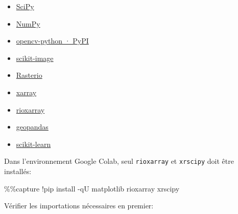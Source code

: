 \documentclass[
  11pt,
  letterpaper,
  open=any,
  twoside=false,
  french]{scrbook}
\newenvironment{Shaded}{\begin{snugshade}}{\end{snugshade}}
\newcommand{\NormalTok}[1]{\textcolor[rgb]{0.00,0.23,0.31}{#1}}
\newcommand{\OperatorTok}[1]{\textcolor[rgb]{0.37,0.37,0.37}{#1}}
\begin{document}
\begin{itemize}
\item
  \href{https://scipy.org/}{SciPy}
\item
  \href{https://numpy.org/}{NumPy}
\item
  \href{https://pypi.org/project/opencv-python/}{opencv-python · PyPI}
\item
  \href{https://scikit-image.org/}{scikit-image}
\item
  \href{https://rasterio.readthedocs.io/en/stable/}{Rasterio}
\item
  \href{https://docs.xarray.dev/en/stable/}{xarray}
\item
  \href{https://corteva.github.io/rioxarray/stable/index.html}{rioxarray}
\item
  \href{https://geopandas.org}{geopandas}
\item
  \href{https://scikit-learn.org/}{scikit-learn}
\end{itemize}

Dans l'environnement Google Colab, seul \texttt{rioxarray} et
\texttt{xrscipy} doit être installés:

\begin{Shaded}
\begin{Highlighting}[]
\OperatorTok{\%\%}\NormalTok{capture}
\OperatorTok{!}\NormalTok{pip install }\OperatorTok{{-}}\NormalTok{qU matplotlib rioxarray xrscipy}
\end{Highlighting}
\end{Shaded}

Vérifier les importations nécessaires en premier:
\end{document}
